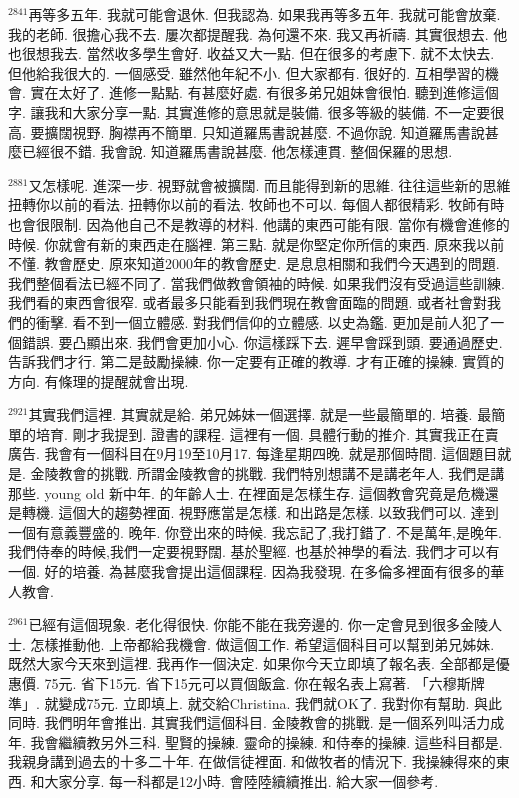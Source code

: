 \documentclass{book}
\begin{document}
$^{2841}$再等多五年.
我就可能會退休.
但我認為.
如果我再等多五年.
我就可能會放棄.
我的老師.
很擔心我不去.
屢次都提醒我.
為何還不來.
我又再祈禱.
其實很想去.
他也很想我去.
當然收多學生會好.
收益又大一點.
但在很多的考慮下.
就不太快去.
但他給我很大的.
一個感受.
雖然他年紀不小.
但大家都有.
很好的.
互相學習的機會.
實在太好了.
進修一點點.
有甚麼好處.
有很多弟兄姐妹會很怕.
聽到進修這個字.
讓我和大家分享一點.
其實進修的意思就是裝備.
很多等級的裝備.
不一定要很高.
要擴闊視野.
胸襟再不簡單.
只知道羅馬書說甚麼.
不過你說.
知道羅馬書說甚麼已經很不錯.
我會說.
知道羅馬書說甚麼.
他怎樣連貫.
整個保羅的思想.

$^{2881}$又怎樣呢.
進深一步.
視野就會被擴闊.
而且能得到新的思維.
往往這些新的思維扭轉你以前的看法.
扭轉你以前的看法.
牧師也不可以.
每個人都很精彩.
牧師有時也會很限制.
因為他自己不是教導的材料.
他講的東西可能有限.
當你有機會進修的時候.
你就會有新的東西走在腦裡.
第三點.
就是你堅定你所信的東西.
原來我以前不懂.
教會歷史.
原來知道2000年的教會歷史.
是息息相關和我們今天遇到的問題.
我們整個看法已經不同了.
當我們做教會領袖的時候.
如果我們沒有受過這些訓練.
我們看的東西會很窄.
或者最多只能看到我們現在教會面臨的問題.
或者社會對我們的衝擊.
看不到一個立體感.
對我們信仰的立體感.
以史為鑑.
更加是前人犯了一個錯誤.
要凸顯出來.
我們會更加小心.
你這樣踩下去.
遲早會踩到頭.
要通過歷史.
告訴我們才行.
第二是鼓勵操練.
你一定要有正確的教導.
才有正確的操練.
實質的方向.
有條理的提醒就會出現.

$^{2921}$其實我們這裡.
其實就是給.
弟兄姊妹一個選擇.
就是一些最簡單的.
培養.
最簡單的培育.
剛才我提到.
證書的課程.
這裡有一個.
具體行動的推介.
其實我正在賣廣告.
我會有一個科目在9月19至10月17.
每逢星期四晚.
就是那個時間.
這個題目就是.
金陵教會的挑戰.
所謂金陵教會的挑戰.
我們特別想講不是講老年人.
我們是講那些.
young old 新中年.
的年齡人士.
在裡面是怎樣生存.
這個教會究竟是危機還是轉機.
這個大的趨勢裡面.
視野應當是怎樣.
和出路是怎樣.
以致我們可以.
達到一個有意義豐盛的.
晚年.
你登出來的時候.
我忘記了,我打錯了.
不是萬年,是晚年.
我們侍奉的時候,我們一定要視野闊.
基於聖經.
也基於神學的看法.
我們才可以有一個.
好的培養.
為甚麼我會提出這個課程.
因為我發現.
在多倫多裡面有很多的華人教會.

$^{2961}$已經有這個現象.
老化得很快.
你能不能在我旁邊的.
你一定會見到很多金陵人士.
怎樣推動他.
上帝都給我機會.
做這個工作.
希望這個科目可以幫到弟兄姊妹.
既然大家今天來到這裡.
我再作一個決定.
如果你今天立即填了報名表.
全部都是優惠價.
75元.
省下15元.
省下15元可以買個飯盒.
你在報名表上寫著.
「六穆斯牌準」.
就變成75元.
立即填上.
就交給Christina.
我們就OK了.
我對你有幫助.
與此同時.
我們明年會推出.
其實我們這個科目.
金陵教會的挑戰.
是一個系列叫活力成年.
我會繼續教另外三科.
聖賢的操練.
靈命的操練.
和侍奉的操練.
這些科目都是.
我親身講到過去的十多二十年.
在做信徒裡面.
和做牧者的情況下.
我操練得來的東西.
和大家分享.
每一科都是12小時.
會陸陸續續推出.
給大家一個參考.
\end{document}
